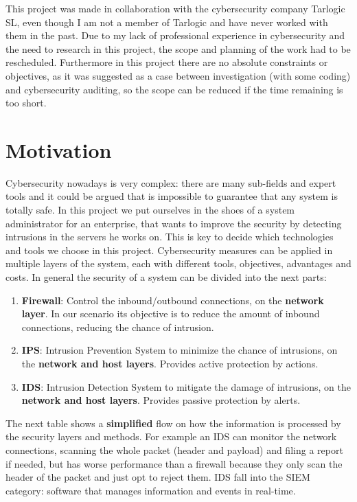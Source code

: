 
This project was made in collaboration with the cybersecurity company Tarlogic SL, even though I am not a member of Tarlogic and have never worked with them in the past.
Due to my lack of professional experience in cybersecurity and the need to research in this project, the scope and planning of the work had to be rescheduled.
Furthermore in this project there are no absolute constraints or objectives, as it was suggested as a case between investigation (with some coding) and cybersecurity auditing, so the scope can be reduced if the time remaining is too short.

\section{Motivation}

Cybersecurity nowadays is very complex: there are many sub-fields and expert tools and it could be argued that is impossible to guarantee that any system is totally safe.
In this project we put ourselves in the shoes of a system administrator for an enterprise, that wants to improve the security by detecting intrusions in the servers he works on. This is key to decide which technologies and tools we choose in this project.
\linej
\linej
Cybersecurity measures can be applied in multiple layers of the system, each with different tools, objectives, advantages and costs.
In general the security of a system can be divided into the next parts:
\begin{enumerate}
	\item \textbf{Firewall}: Control the inbound/outbound connections, on the \textbf{network layer}. In our scenario its objective is to reduce the amount of inbound connections, reducing the chance of intrusion.
	\item \textbf{IPS}: Intrusion Prevention System to minimize the chance of intrusions, on the \textbf{network and host layers}. Provides active protection by actions.
	\item \textbf{IDS}: Intrusion Detection System to mitigate the damage of intrusions, on the \textbf{network and host layers}. Provides passive protection by alerts.
\end{enumerate}

\linej
The next table shows a \textbf{simplified} flow on how the information is processed by the security layers and methods.
For example an IDS can monitor the network connections, scanning the whole packet (header and payload) and filing a report if needed, but has worse performance than a firewall because they only scan the header of the packet and just opt to reject them\cite{firewall-ipds-ids_comparison}.
IDS fall into the SIEM category: software that manages information and events in real-time.

